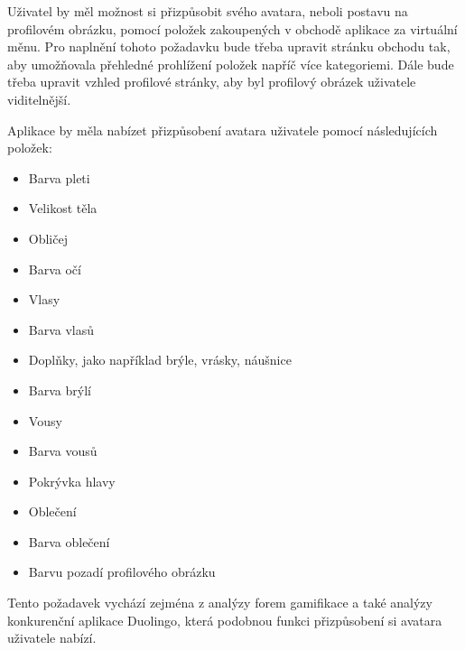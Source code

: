Uživatel by měl možnost si přizpůsobit svého avatara, neboli postavu na profilovém obrázku, pomocí položek zakoupených v obchodě aplikace za virtuální měnu. Pro naplnění tohoto požadavku bude třeba upravit stránku obchodu tak, aby umožňovala přehledné prohlížení položek napříč více kategoriemi. Dále bude třeba upravit vzhled profilové stránky, aby byl profilový obrázek uživatele viditelnější. %

Aplikace by měla nabízet přizpůsobení avatara uživatele pomocí následujících položek:


\begin{itemize}
    \item Barva pleti
    \item Velikost těla
    \item Obličej
    \item Barva očí
    \item Vlasy
    \item Barva vlasů
    \item Doplňky, jako například brýle, vrásky, náušnice
    \item Barva brýlí
    \item Vousy
    \item Barva vousů   
    \item Pokrývka hlavy
    \item Oblečení %
    \item Barva oblečení %
    \item Barvu pozadí profilového obrázku
\end{itemize}

Tento požadavek vychází zejména z analýzy forem gamifikace a také analýzy konkurenční aplikace Duolingo, která podobnou funkci přizpůsobení si avatara uživatele nabízí.

